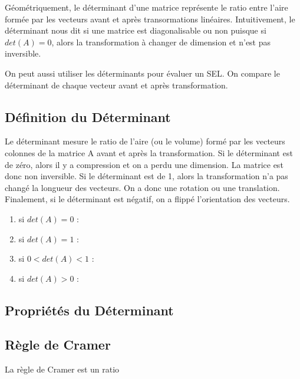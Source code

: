 \documentclass{article}
\begin{document}
Géométriquement, le déterminant d'une matrice représente le ratio entre l'aire
formée par les vecteurs avant et après transormations linéaires. Intuitivement,
le déterminant nous dit si une matrice est diagonalisable ou non puisque si
$det(A)=0$, alors la transformation à changer de dimension et n'est pas inversible.

On peut aussi utiliser les déterminants pour évaluer un SEL. On compare le déterminant
de chaque vecteur avant et après transformation.

\subsection{Définition du Déterminant}

\begin{definition}

\end{definition}

\begin{remark}
    Le déterminant mesure le ratio de l'aire (ou le volume) formé par les
    vecteurs colonnes de la matrice A avant et après la transformation.
    Si le déterminant est de zéro, alors il y a compression et on a perdu
    une dimension. La matrice est donc non inversible. Si le déterminant
    est de 1, alors la transformation n'a pas changé la longueur des
    vecteurs. On a donc une rotation ou une translation. Finalement, si
    le déterminant est négatif, on a flippé l'orientation des vecteurs.
    \begin{enumerate}
	\item si $det(A) = 0$ :
	\item si $det(A) = 1$ :
	\item si $0 < det(A) < 1$ :
	\item si $det(A) > 0$ :
    \end{enumerate}
\end{remark}

\subsection{Propriétés du Déterminant}

\subsection{Règle de Cramer}

\begin{intuition}
    La règle de Cramer est un ratio
\end{intuition}
\end{document}
